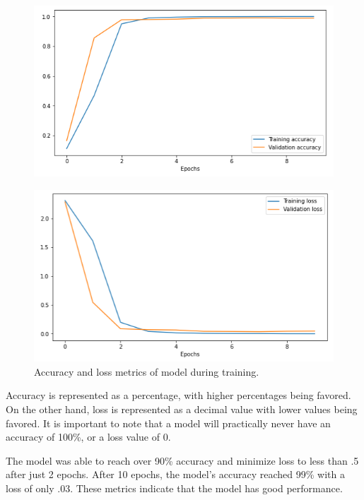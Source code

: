 \documentclass[11pt,conference]{IEEEtran}
\begin{document}
\begin{figure}[htbp]
	\centerline{\includegraphics[scale=0.45]{images/accuracy.png}}
	\label{figure}
\end{figure}
\begin{figure}[htbp]
	\centerline{\includegraphics[scale=0.45]{images/loss.png}}
	\caption{Accuracy and loss metrics of model during training.}
	\label{figure}
\end{figure}

Accuracy is represented as a percentage, with higher percentages being favored. On
the other hand, loss is represented as a decimal value with lower values being
favored. It is important to note that a model will practically never have an
accuracy of 100\%, or a loss value of 0.

The model was able to reach over 90\% accuracy and
minimize loss to less than .5 after just 2 epochs. After 10 epochs, the model's
accuracy reached 99\% with a loss of only .03. These metrics indicate that the
model has good performance.
\end{document}
